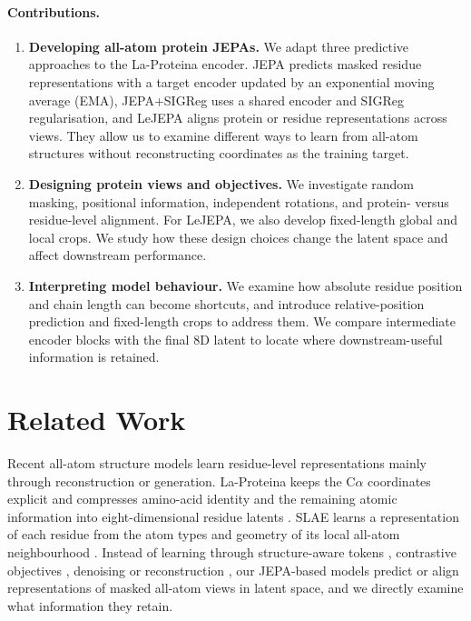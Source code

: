 \documentclass{article}
\begin{document}
\paragraph{Contributions.}
\begin{enumerate}
    \item \textbf{Developing all-atom protein JEPAs.} We adapt three predictive approaches to the La-Proteina encoder. JEPA predicts masked residue representations with a target encoder updated by an exponential moving average (EMA), JEPA+SIGReg uses a shared encoder and SIGReg regularisation, and LeJEPA aligns protein or residue representations across views. They allow us to examine different ways to learn from all-atom structures without reconstructing coordinates as the training target.
    \item \textbf{Designing protein views and objectives.} We investigate random masking, positional information, independent rotations, and protein- versus residue-level alignment. For LeJEPA, we also develop fixed-length global and local crops. We study how these design choices change the latent space and affect downstream performance.
    \item \textbf{Interpreting model behaviour.} We examine how absolute residue position and chain length can become shortcuts, and introduce relative-position prediction and fixed-length crops to address them. We compare intermediate encoder blocks with the final 8D latent to locate where downstream-useful information is retained.
\end{enumerate}

\section{Related Work}
\label{sec:related-work}


Recent all-atom structure models learn residue-level representations mainly through reconstruction or generation. La-Proteina keeps the C$\alpha$ coordinates explicit and compresses amino-acid identity and the remaining atomic information into eight-dimensional residue latents \citep{la-proteina}. SLAE learns a representation of each residue from the atom types and geometry of its local all-atom neighbourhood \citep{chen2026slae}. Instead of learning through structure-aware tokens \citep{DBLP:conf/iclr/SuHZSZY24}, contrastive objectives \citep{zhang2023protein}, denoising \citep{zhang2023siamdiff} or reconstruction \citep{la-proteina,chen2026slae}, our JEPA-based models predict or align representations of masked all-atom views in latent space, and we directly examine what information they retain.
\end{document}
